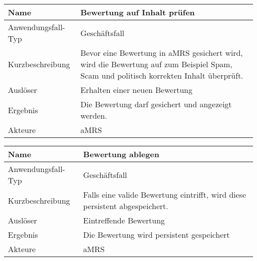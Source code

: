 \begin{table}[H]
    \centering
    \label{bewertungPruefen}
    \begin{tabularx}{\textwidth}{| l | X |}
        \hline
        Name               & Bewertung auf Inhalt prüfen                                                                                                   \\
        \hline
        Anwendungsfall-Typ & Geschäftsfall                                                                                                                 \\
        \hline
        Kurzbeschreibung   & Bevor eine Bewertung in \ac{aMRS} gesichert wird, wird die Bewertung auf zum Beispiel Spam, Scam und politisch korrekten Inhalt überprüft. \\
        \hline
        Auslöser           & Erhalten einer neuen Bewertung                                                                                                \\
        \hline
        Ergebnis           & Die Bewertung darf gesichert und angezeigt werden.                                                                            \\
        \hline
        Akteure            & \ac{aMRS}                                                                                                                     \\
        \hline
    \end{tabularx}
\end{table}


\begin{table}[H]
    \centering
    \label{bewertungablegen}
    \begin{tabularx}{\textwidth}{| l | X |}
        \hline
        Name               & Bewertung ablegen                                                                   \\
        \hline
        Anwendungsfall-Typ & Geschäftsfall                                                                       \\
        \hline
        Kurzbeschreibung   & Falls eine valide Bewertung eintrifft, wird diese persistent abgespeichert. \\
        \hline
        Auslöser           & Eintreffende Bewertung                                                              \\
        \hline
        Ergebnis           & Die Bewertung wird persistent gespeichert                                        \\
        \hline
        Akteure            & \ac{aMRS}                                                       \\
        \hline
    \end{tabularx}
\end{table}

